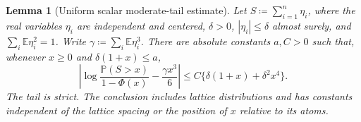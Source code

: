 \documentclass[11pt,letterpaper]{article}
\newtheorem{lemma}{Lemma}
\theoremstyle{remark}
\newcommand{\E}{\mathbb E}
\newcommand{\Pp}{\mathbb P}
\begin{document}
\begin{lemma}[Uniform scalar moderate-tail estimate]
\label{opt:moderate-tail}
Let \(S\coloneqq\sum_{i=1}^n\eta_i\), where the real variables \(\eta_i\) are
independent and centered, \(\delta>0\), \(|\eta_i|\le\delta\)
almost surely, and
\(\sum_i\E\eta_i^2=1\). Write
\(\gamma\coloneqq\sum_i\E\eta_i^3\). There are absolute constants \(a,C>0\)
such that, whenever \(x\ge0\) and \(\delta(1+x)\le a\),
\begin{equation}
 \left|\log\frac{\Pp(S>x)}{1-\Phi(x)}
       -\frac{\gamma x^3}{6}\right|
 \le C\{\delta(1+x)+\delta^2x^4\}.
 \label{opt:moderate-tail-formula}
\end{equation}
The tail is strict. The conclusion includes lattice distributions and
has constants independent of the lattice spacing or the position of
\(x\) relative to its atoms.
\end{lemma}
\end{document}
